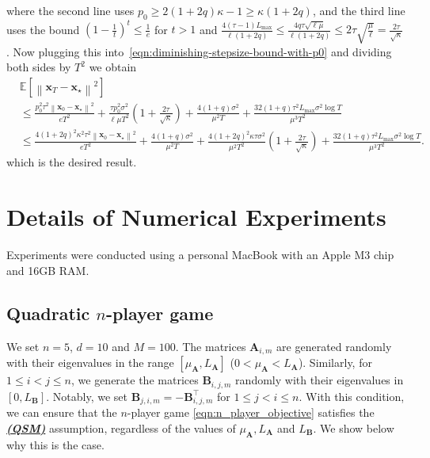 \documentclass{article}
\newcommand{\vx}{{\mathbf{x}}}
\newcommand{\vA}{{\mathbf{A}}}
\newcommand{\vB}{{\mathbf{B}}}
\newcommand{\sqnorm}[1]{\left\| #1 \right\|^2}
\theoremstyle{plain}
\theoremstyle{remark}
\begin{document}
where the second line uses $p_0 \ge 2(1+2q)\kappa - 1 \ge \kappa(1+2q)$, and the third line uses the bound $\left(1-\frac{1}{t}\right)^t \le \frac{1}{e}$ for $t>1$ and $\frac{4(\tau-1) L_{\mathrm{max}}}{\ell(1+2q)} \le \frac{4q\tau\sqrt{\ell\mu}}{\ell(1+2q)} \le 2\tau\sqrt{\frac{\mu}{\ell}} = \frac{2\tau}{\sqrt{\kappa}}$.
Now plugging this into~\eqref{eqn:diminishing-stepsize-bound-with-p0} and dividing both sides by $T^2$ we obtain
\begin{align*}
    & \mathbb{E} 
    \left[ \sqnorm{\vx_{T} - \vx_\star} \right] \\
    & \le \frac{p_0^2 \tau^2 \sqnorm{\vx_0 - \vx_\star}}{e T^2} + \frac{\tau p_0^2 \sigma^2}{\ell\mu T^2} \left( 1 + \frac{2\tau}{\sqrt{\kappa}} \right) + \frac{4(1+q)\sigma^2}{\mu^2 T} + \frac{32(1+q) \tau^2 L_{\mathrm{max}} \sigma^2 \log T}{\mu^3 T^2}  \\
    & \le \frac{4(1+2q)^2 \kappa^2 \tau^2 \sqnorm{\vx_0 - \vx_\star}}{e T^2} + \frac{4(1+q)\sigma^2}{\mu^2 T} + \frac{4(1+2q)^2 \kappa\tau\sigma^2}{\mu^2 T^2} \left( 1 + \frac{2\tau}{\sqrt{\kappa}} \right) + \frac{32(1+q) \tau^2 L_{\mathrm{max}} \sigma^2 \log T}{\mu^3 T^2} .
\end{align*}
which is the desired result.

\newpage

\section{Details of Numerical Experiments}
\label{section:details-of-experiments}

Experiments were conducted using a personal MacBook with an Apple M3 chip and 16GB RAM. 

\subsection{Quadratic $n$-player game} \label{sec:nplayer_game}

We set $n=5$, $d = 10$ and $M = 100$. 
The matrices $\mathbf{A}_{i,m}$ are generated randomly with their eigenvalues in the range $\left[\mu_{\mathbf{A}}, L_{\mathbf{A}}\right]$ ($0 < \mu_{\mathbf{A}} < L_{\mathbf{A}}$). 
Similarly, for $1 \leq i < j \leq n$, we generate the matrices $\mathbf{B}_{i, j, m}$ randomly with their eigenvalues in $\left[0, L_{\mathbf{B}}\right]$. 
Notably, we set $\mathbf{B}_{j,i,m} = -\mathbf{B}_{i,j,m}^\intercal$ for $1 \leq j < i \leq n$.
With this condition, we can ensure that the $n$-player game \eqref{eqn:n_player_objective} satisfies the \hyperref[assumption:quasi-strong-monotonicity]{\textbf{\emph{(QSM)}}} assumption, regardless of the values of $\mu_\vA, L_\vA$ and $L_\vB$.
We show below why this is the case.
\end{document}
